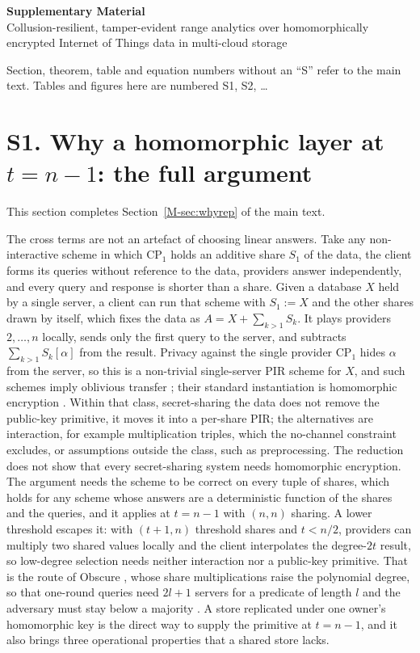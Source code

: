 \documentclass[11pt,a4paper]{article}
\newcommand{\mref}[1]{\ref{M-#1}}
\begin{document}
\begin{center}
{\Large\bfseries Supplementary Material}\\[4pt]
{\large Collusion-resilient, tamper-evident range analytics over homomorphically
encrypted Internet of Things data in multi-cloud storage}
\end{center}
\noindent Section, theorem, table and equation numbers without an ``S'' refer to
the main text. Tables and figures here are numbered S1, S2, \dots
\medskip
\section*{S1. Why a homomorphic layer at $t=n-1$: the full argument}

This section completes Section~\mref{sec:whyrep} of the main text.

The cross terms are not an artefact of choosing linear answers. Take any
non-interactive scheme in which $\text{CP}_1$ holds an additive share $S_1$ of
the data, the client forms its queries without reference to the data,
providers answer independently, and every query and response is shorter than a
share. Given a database $X$ held by a single server, a client
can run that scheme with $S_1:=X$ and the other shares drawn by itself, which
fixes the data as $A=X+\sum_{k>1}S_k$. It plays providers $2,\dots,n$ locally,
sends only the first query to the server, and subtracts $\sum_{k>1}S_k[\alpha]$
from the result. Privacy against the single provider $\text{CP}_1$ hides
$\alpha$ from the server, so this is a non-trivial single-server PIR scheme for
$X$, and such schemes imply oblivious transfer \citep{dicrescenzo2000single};
their standard instantiation is homomorphic encryption
\citep{kushilevitz1997replication}. Within that class, secret-sharing the data
does not remove the public-key primitive, it moves it into a per-share PIR; the
alternatives are interaction, for example multiplication triples, which the
no-channel constraint excludes, or assumptions outside the class, such as
preprocessing. The reduction does not show that every secret-sharing system
needs homomorphic encryption. The argument needs the
scheme to be correct on every tuple of shares, which holds for any scheme whose
answers are a deterministic function of the shares and the queries, and it
applies at $t=n-1$ with $(n,n)$ sharing. A lower threshold escapes it: with
$(t{+}1,n)$ threshold shares and $t<n/2$, providers can multiply two shared
values locally and the client interpolates the degree-$2t$ result, so
low-degree selection needs neither interaction nor a public-key primitive. That
is the route of Obscure \citep{gupta2020obscure}, whose share
multiplications raise the polynomial degree, so that one-round queries need
$2l+1$ servers for a predicate of length $l$ and the adversary must stay below
a majority \citep[\S2.1, \S3.2]{gupta2020obscure}. A store replicated
under one owner's homomorphic key is the direct way to supply the primitive at
$t=n-1$, and it also brings three operational properties that a shared store
lacks.
\end{document}

